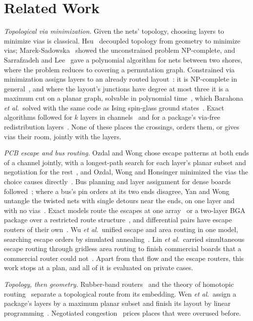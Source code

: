 \documentclass[journal]{IEEEtran}
\begin{document}
\section{Related Work}
\label{sec:related}
\emph{Topological via minimization.} Given the nets' topology, choosing layers to minimize vias is classical. Hsu~\cite{hsu1983} decoupled topology from geometry to minimize vias; Marek-Sadowska~\cite{marek1984} showed the unconstrained problem NP-complete, and Sarrafzadeh and Lee~\cite{sarrafzadeh1989} gave a polynomial algorithm for nets between two shores, where the problem reduces to covering a permutation graph. Constrained via minimization assigns layers to an already routed layout~\cite{pinter1984}: it is NP-complete in general~\cite{naclerio1989}, and where the layout's junctions have degree at most three it is a maximum cut on a planar graph, solvable in polynomial time~\cite{hadlock1975,pinter1984}, which Barahona \emph{et al.}\ solved with the same code as Ising spin-glass ground states~\cite{barahona1988}. Exact algorithms followed for $k$ layers in channels~\cite{rim1989,cong1991} and for a package's via-free redistribution layers~\cite{lin2017}. None of these places the crossings, orders them, or gives vias their room, jointly with the layers.

\emph{PCB escape and bus routing.} Ozdal and Wong chose escape patterns at both ends of a channel jointly, with a longest-path search for each layer's planar subset and negotiation for the rest~\cite{ozdal2006ser}, and Ozdal, Wong and Honsinger minimized the vias the choice causes directly~\cite{ozdal2008via}. Bus planning and layer assignment for dense boards followed~\cite{kong2009,yan2019}; where a bus's pin orders at its two ends disagree, Yan and Wong untangle the twisted nets with single detours near the ends, on one layer and with no vias~\cite{yan2007untangle,yan2009untangle}. Exact models route the escapes at one array~\cite{luo2008,bayless2016} or a two-layer BGA package over a restricted route structure~\cite{tomioka2009}, and differential pairs have escape routers of their own~\cite{yan2010diff}. Wu \emph{et al.}\ unified escape and area routing in one model, searching escape orders by simulated annealing~\cite{wu2026}. Lin \emph{et al.}\ carried simultaneous escape routing through gridless area routing to finish commercial boards that a commercial router could not~\cite{lin2021}. Apart from that flow and the escape routers, this work stops at a plan, and all of it is evaluated on private cases.

\emph{Topology, then geometry.} Rubber-band routers~\cite{dai1991} and the theory of homotopic routing~\cite{leiserson1985} separate a topological route from its embedding. Wen \emph{et al.}\ assign a package's layers by a maximum planar subset and finish its layout by linear programming~\cite{wen2022}. Negotiated congestion~\cite{mcmurchie1995} prices places that were overused before.
\end{document}
